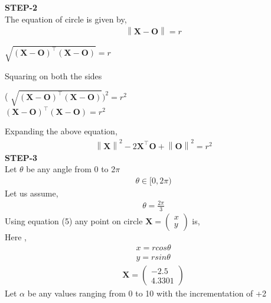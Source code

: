 \documentclass[10pt,a4paper]{report}
\newcommand{\myvec}[1]{\ensuremath{\begin{pmatrix}#1\end{pmatrix}}}
\let\vec\mathbf
\providecommand{\norm}[1]{\left\lVert#1\right\rVert}
\let\vec\mathbf
\begin{document}
\begin{multicols}{2}
\textbf{STEP-2}\vspace{2mm}\\
The equation of circle is given by, \\ \vspace{1mm}
\begin{align}
    \norm{\vec{X}-\vec{O}} = r 
\end{align}
\begin{center}
   $ \sqrt{(\vec{X}-\vec{O})^{\top}(\vec{X}-\vec{O})} = r $
\end{center}\vspace{5mm}

Squaring on both the sides \\ \vspace{2mm}
\begin{center}
( $ \sqrt{(\vec{X}-\vec{O})^{\top}(\vec{X}-\vec{O})} )^2 = r^2 $\\ \vspace{0.5cm}
$(\vec{X}-\vec{O})^{\top}(\vec{X}-\vec{O})=r^2$
\end{center}
Expanding the above equation,\\ \vspace{1mm}
\begin{align}
    \norm{\vec{X}}^2-2\vec{X}^{\top}\vec{O}+\norm{\vec{O}}^2=r^2
\end{align}
\textbf{STEP-3}\vspace{2mm}\\
Let $\theta$ be any angle from 0 to 2$\pi$\\ \vspace{1mm}
\begin{align}
    \theta \in [0,2\pi)
\end{align}
Let us assume, \\ \vspace{1mm}
\begin{align}
    \theta=\frac{2\pi}{3} 
\end{align}
Using equation (5) any point on circle   $ \vec{X}=\myvec{
    x\\
    y
    } $ is, \\ \vspace{1mm}
    Here ,\\  \vspace{2mm}
\begin{align}
    x=rcos\theta\\
    y=rsin\theta
\end{align}
\begin{align}
 \vec{X}=\myvec{
    -2.5\\
    4.3301
    } 
\end{align}
Let $\alpha$ be any values ranging from 0 to 10 with the incrementation of +2\\\vspace{1mm}


\end{multicols}
\end{document}
